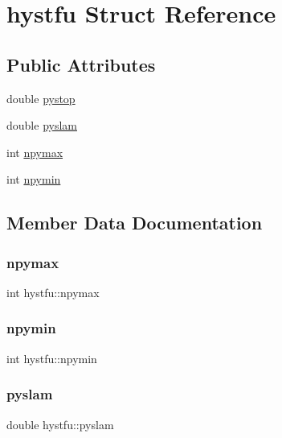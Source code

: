 \hypertarget{structhystfu}{}\section{hystfu Struct Reference}
\label{structhystfu}
\subsection*{Public Attributes}
\begin{DoxyCompactItemize}
\item 
double \hyperlink{structhystfu_a08d7e516c62ba7c4928e1e6a4544f788}{pystop}
\item 
double \hyperlink{structhystfu_a17231a077a10b073be8c6c67b8115243}{pyslam}
\item 
int \hyperlink{structhystfu_a60571190ec191bd094d70674bb9297c6}{npymax}
\item 
int \hyperlink{structhystfu_aae69938e1d9e59aa8b02e4ea42345b85}{npymin}
\end{DoxyCompactItemize}


\subsection{Member Data Documentation}
\mbox{\label{structhystfu_a60571190ec191bd094d70674bb9297c6}} 
\subsubsection{\texorpdfstring{npymax}{npymax}}
{\footnotesize\ttfamily int hystfu\+::npymax}

\mbox{\label{structhystfu_aae69938e1d9e59aa8b02e4ea42345b85}} 
\subsubsection{\texorpdfstring{npymin}{npymin}}
{\footnotesize\ttfamily int hystfu\+::npymin}

\mbox{\label{structhystfu_a17231a077a10b073be8c6c67b8115243}} 
\subsubsection{\texorpdfstring{pyslam}{pyslam}}
{\footnotesize\ttfamily double hystfu\+::pyslam}


